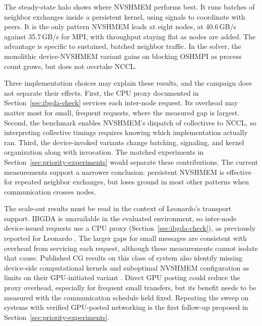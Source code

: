 The steady-state halo shows where NVSHMEM performs best. It runs batches of neighbor exchanges inside a persistent kernel, using signals to coordinate with peers. It is the only pattern NVSHMEM leads at eight nodes, at 40.6\,GB/s against 35.7\,GB/s for MPI, with throughput staying flat as nodes are added. The advantage is specific to sustained, batched neighbor traffic. In the solver, the monolithic device-NVSHMEM variant gains on blocking OSHMPI as process count grows, but does not overtake NCCL.

Three implementation choices may explain these results, and the campaign does not separate their effects. First, the CPU proxy documented in Section~\ref{sec:ibgda-check} services each inter-node request. Its overhead may matter most for small, frequent requests, where the measured gap is largest. Second, the benchmark enables NVSHMEM's dispatch of collectives to NCCL, so interpreting collective timings requires knowing which implementation actually ran. Third, the device-invoked variants change batching, signaling, and kernel organization along with invocation. The matched experiments in Section~\ref{sec:priority-experiments} would separate these contributions. The current measurements support a narrower conclusion: persistent NVSHMEM is effective for repeated neighbor exchanges, but loses ground in most other patterns when communication crosses nodes.

The scale-out results must be read in the context of Leonardo's transport support. IBGDA is unavailable in the evaluated environment, so inter-node device-issued requests use a CPU proxy (Section~\ref{sec:ibgda-check}), as previously reported for Leonardo \cite{trotter_cpu-_2025}. The larger gaps for small messages are consistent with overhead from servicing each request, although these measurements cannot isolate that cause. Published CG results on this class of system also identify missing device-side computational kernels and suboptimal NVSHMEM configuration as limits on their GPU-initiated variant \cite{trotter_cpu-_2025}. Direct GPU posting could reduce the proxy overhead, especially for frequent small transfers, but its benefit needs to be measured with the communication schedule held fixed. Repeating the sweep on systems with verified GPU-posted networking is the first follow-up proposed in Section~\ref{sec:priority-experiments}.

